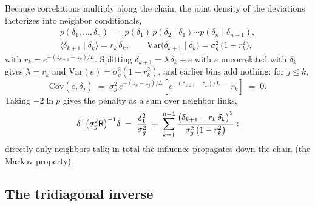 Because correlations multiply along the chain, the joint density of
the deviations factorizes into neighbor conditionals,
\begin{equation}
  \begin{gathered}
    p(\delta_1, \dots, \delta_n)
    \;=\;
    p(\delta_1)\, p(\delta_2 \mid \delta_1) \cdots
    p(\delta_n \mid \delta_{n-1}),
    \\
    \bigl\langle \delta_{k+1} \mid \delta_k \bigr\rangle
    = r_k\,\delta_k,
    \qquad
    \mathrm{Var}\bigl(\delta_{k+1} \mid \delta_k\bigr)
    = \sigma_g^2\,\bigl(1 - r_k^2\bigr),
  \end{gathered}
  \label{eq:chainfactor}
\end{equation}
with $r_k = e^{-(\bar{z}_{k+1} - \bar{z}_k)/L}$.  Splitting
$\delta_{k+1} = \lambda\,\delta_k + e$ with $e$ uncorrelated with
$\delta_k$ gives $\lambda = r_k$ and
$\mathrm{Var}(e) = \sigma_g^2 (1 - r_k^2)$, and earlier bins add
nothing: for $j \le k$,
\begin{equation}
  \mathrm{Cov}(e, \delta_j)
  \;=\;
  \sigma_g^2\, e^{-(\bar{z}_k - \bar{z}_j)/L}
  \left[
    e^{-(\bar{z}_{k+1} - \bar{z}_k)/L} - r_k
  \right]
  \;=\; 0 .
  \label{eq:pastfree}
\end{equation}
Taking $-2 \ln p$ gives the penalty as a sum over neighbor links,
\begin{equation}
  \delta^{\mathsf{T}} \bigl(\sigma_g^2 \mathsf{R}\bigr)^{-1} \delta
  \;=\;
  \frac{\delta_1^2}{\sigma_g^2}
  \;+\;
  \sum_{k=1}^{n-1}
  \frac{\bigl(\delta_{k+1} - r_k\,\delta_k\bigr)^2}
       {\sigma_g^2\,\bigl(1 - r_k^2\bigr)} :
  \label{eq:chainsum}
\end{equation}
directly only neighbors talk; in total the influence propagates down
the chain (the Markov property).

\subsection{The tridiagonal inverse}
\label{sec:tridiag}

